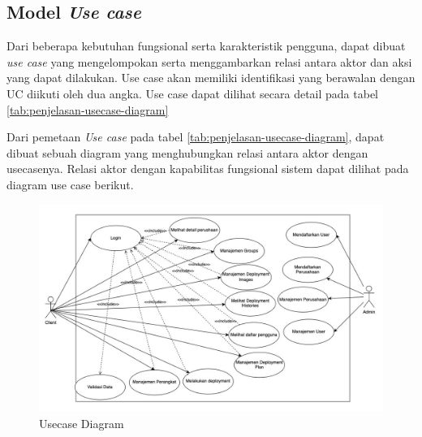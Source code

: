 \subsection{Model \textit{Use case}}
\label{subsec:model-usecase}
Dari beberapa kebutuhan fungsional serta karakteristik pengguna, dapat dibuat \textit{use case} yang mengelompokan serta menggambarkan relasi antara aktor dan aksi yang dapat dilakukan. Use case akan memiliki identifikasi yang berawalan dengan UC diikuti oleh dua angka. Use case dapat dilihat secara detail pada tabel \ref{tab:penjelasan-usecase-diagram}

Dari pemetaan \textit{Use case} pada tabel \ref{tab:penjelasan-usecase-diagram}, dapat dibuat sebuah diagram yang menghubungkan relasi antara aktor dengan usecasenya. Relasi  aktor dengan kapabilitas fungsional sistem dapat dilihat pada diagram use case berikut.

\begin{figure}[ht]
  \centering
  \includegraphics[width=1\textwidth]{resources/chapter-3/usecase-diagram.jpg}
  \caption{Usecase Diagram}
  \label{fig:usecase-diagram}
\end{figure}